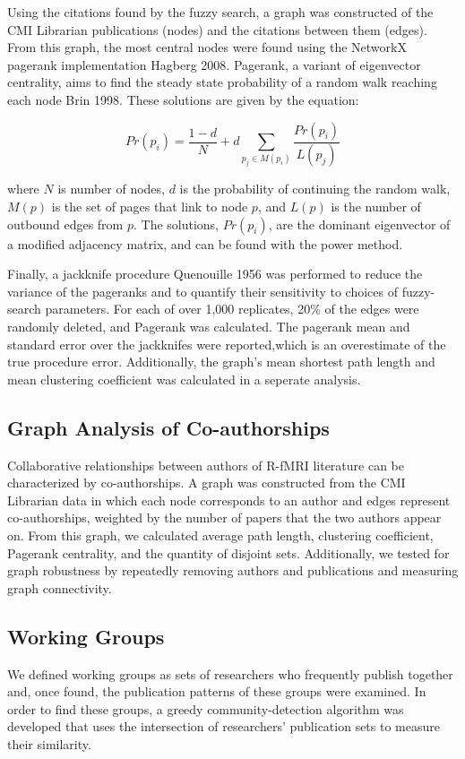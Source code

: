 \documentclass[12pt,3p]{elsarticle}
\begin{document}
Using the citations found by the fuzzy search, a graph was constructed of the
CMI Librarian publications (nodes) and the citations between them (edges). From
this graph, the most central nodes were found using the NetworkX pagerank
implementation {Hagberg 2008}. Pagerank, a variant of eigenvector centrality,
aims to find the steady state probability of a random walk reaching each node
{Brin 1998}. These solutions are given by the equation:

\begin{equation}
P\!r(p_i)=\frac{1-d}{N} + d\!\sum_{p_j \in M(p_i)}\frac{P\!r(p_i)}{L(p_j)}
\end{equation}

\noindent where $N$ is number of nodes, $d$ is the
probability of continuing the random walk, $M(p)$ is the set of pages that link to
node $p$, and $L(p)$ is the number of outbound edges from $p$. The solutions,
$P\!r(p_i)$,
are the dominant eigenvector of a modified adjacency matrix, and can be found
with the power method.

Finally, a jackknife procedure {Quenouille 1956} was performed to reduce the
variance of the pageranks and to quantify their sensitivity to choices of
fuzzy-search parameters. For each of over 1,000 replicates, 20\% of the edges were randomly
deleted, and Pagerank was calculated.  The pagerank mean
and standard error over the jackknifes were reported,which is an overestimate of the true procedure error.  
Additionally, the graph's mean shortest path length and mean clustering coefficient was
calculated in a seperate analysis.


\subsection{Graph Analysis of Co-authorships}
Collaborative relationships between authors of R-fMRI literature can be
characterized by co-authorships. A graph was constructed from the CMI Librarian data in which each
node corresponds to an author and edges represent co-authorships, weighted by
the number of papers that the two authors appear on. From this graph, we
calculated average path length, clustering coefficient, Pagerank centrality,
and the quantity of disjoint sets. Additionally, we tested for graph robustness
by repeatedly removing authors and publications and measuring graph
connectivity.

\subsection{Working Groups}
We defined working groups as sets of researchers who frequently publish together
and, once found, the publication patterns of these groups were examined. In
order to find these groups, a greedy community-detection algorithm was developed
that uses the intersection of researchers’ publication sets to measure their
similarity.
\end{document}
